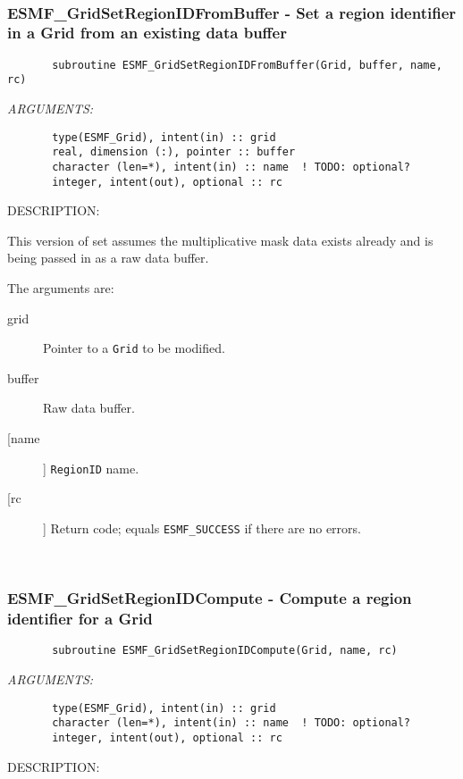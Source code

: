 {%
 
\mbox{}\hrulefill\ 
 
\subsubsection{ESMF\_GridSetRegionIDFromBuffer - Set a region identifier in a Grid from an existing data buffer}


 
\begin{verbatim}       subroutine ESMF_GridSetRegionIDFromBuffer(Grid, buffer, name, rc)\end{verbatim}{\em ARGUMENTS:}
\begin{verbatim}       type(ESMF_Grid), intent(in) :: grid
       real, dimension (:), pointer :: buffer
       character (len=*), intent(in) :: name  ! TODO: optional?
       integer, intent(out), optional :: rc            \end{verbatim}
{\sf DESCRIPTION:\\ }


       This version of set assumes the multiplicative mask data exists already
       and is being passed in as a raw data buffer.
  
       The arguments are:
       \begin{description}
       \item[grid] 
            Pointer to a {\tt Grid} to be modified.
       \item[buffer]
            Raw data buffer.         
       \item [[name]]
             {\tt RegionID} name.
       \item[[rc]] 
            Return code; equals {\tt ESMF\_SUCCESS} if there are no errors.
       \end{description}
   
 
\mbox{}\hrulefill\ 
 
\subsubsection{ESMF\_GridSetRegionIDCompute - Compute a region identifier for a Grid}


 
\begin{verbatim}       subroutine ESMF_GridSetRegionIDCompute(Grid, name, rc)\end{verbatim}{\em ARGUMENTS:}
\begin{verbatim}       type(ESMF_Grid), intent(in) :: grid
       character (len=*), intent(in) :: name  ! TODO: optional?
       integer, intent(out), optional :: rc            \end{verbatim}
{\sf DESCRIPTION:\\ }


}
